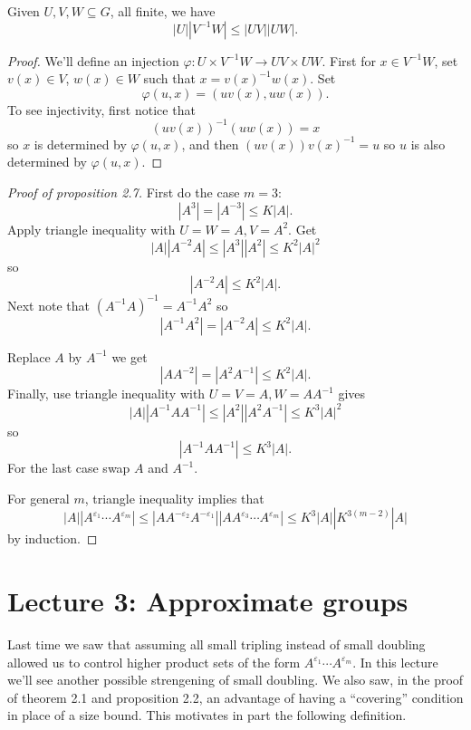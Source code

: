 \documentclass[a4paper]{article}
\begin{document}
\begin{lemma}
  Given \(U, V, W \subseteq G\), all finite, we have
  \[
    |U| |V^{-1} W| \leq |UV| |UW|.
  \]
\end{lemma}

\begin{proof}
  We'll define an injection \(\varphi: U \times V^{-1}W \to UV \times UW\). First for \(x \in V^{-1}W\), set \(v(x) \in V\), \(w(x) \in W\) such that \(x = v(x)^{-1}w(x)\). Set
  \[
    \varphi(u, x) = (uv(x), uw(x)).
  \]
  To see injectivity, first notice that
  \[
    (uv(x))^{-1}(uw(x)) = x
  \]
  so \(x\) is determined by \(\varphi(u, x)\), and then \((uv(x)) v(x)^{-1} = u\) so \(u\) is also determined by \(\varphi(u, x)\).
\end{proof}

\begin{proof}[Proof of proposition 2.7]
  First do the case \(m = 3\):
  \[
    |A^3| = |A^{-3}| \leq K|A|.
  \]
  Apply triangle inequality with \(U = W = A, V = A^2\). Get
  \[
    |A||A^{-2}A| \leq |A^3| |A^2| \leq K^2 |A|^2
  \]
  so
  \[
    |A^{-2}A| \leq K^2 |A|.
  \]
  Next note that \((A^{-1}A)^{-1} = A^{-1}A^2\) so
  \[
    |A^{-1}A^2| = |A^{-2}A| \leq K^2|A|.
  \]

  Replace \(A\) by \(A^{-1}\) we get
  \[
    |AA^{-2}| = |A^2A^{-1}| \leq K^2 |A|.
  \]
  Finally, use triangle inequality with \(U = V = A, W = AA^{-1}\) gives
  \[
    |A| |A^{-1}AA^{-1}| \leq |A^2| |A^2A^{-1}| \leq K^3 |A|^2
  \]
  so
  \[
    |A^{-1}AA^{-1}| \leq K^3 |A|.
  \]
  For the last case swap \(A\) and \(A^{-1}\).

  For general \(m\), triangle inequality implies that
  \[
    |A| |A^{\varepsilon_1} \cdots A^{\varepsilon_m}|
    \leq |AA^{-\varepsilon_2}A^{-\varepsilon_1}| |AA^{\varepsilon_3} \cdots A^{\varepsilon_m}|
    \leq K^3 |A| |K^{3(m - 2)} |A|
  \]
  by induction.
\end{proof}

\section*{Lecture 3: Approximate groups}

Last time we saw that assuming all small tripling instead of small doubling allowed us to control higher product sets of the form \(A^{\varepsilon_1} \cdots A^{\varepsilon_m}\). In this lecture we'll see another possible strengening of small doubling. We also saw, in the proof of theorem 2.1 and proposition 2.2, an advantage of having a ``covering'' condition in place of a size bound. This motivates in part the following definition.
\end{document}

